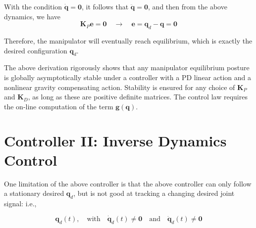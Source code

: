 \documentclass[10pt]{article}
\begin{document}
With the condition  $\dot{\boldsymbol{q}}=\mathbf{0}$, it follows that   $\ddot{\boldsymbol{q}} =\mathbf{0}$, and then from the above dynamics, we have
$$
\boldsymbol{K}_{P} {\boldsymbol{e}}=\mathbf{0} \quad\rightarrow\quad {\boldsymbol{e}}=\boldsymbol{q}_{d}-\boldsymbol{q} = \mathbf{0}
$$

Therefore, the manipulator will eventually reach equilibrium, which is exactly the desired configuration  $\boldsymbol{q}_{d}$.


The above derivation rigorously shows that any manipulator equilibrium posture is globally asymptotically stable under a controller with a PD linear action and a nonlinear gravity compensating action. Stability is ensured for any choice of $\boldsymbol{K}_{P}$ and $\boldsymbol{K}_{D}$, as long as these are positive definite matrices. 
The control law requires the on-line computation of the term $\boldsymbol{g}(\boldsymbol{q})$. 



\section{Controller II: Inverse Dynamics Control}
One limitation of the above controller is that the above controller can only follow a stationary desired $\boldsymbol{q}_d$, but is not good at tracking a changing desired joint signal: i.e., 

\begin{equation}
\label{equ.joint_signal}
\boldsymbol{q}_d(t),\quad\text{with} \quad \boldsymbol{\dot{q}}_d(t)\neq\boldsymbol{0} \quad \text{and} \quad \boldsymbol{\ddot{q}}_d(t)\neq\boldsymbol{0} 
\end{equation}
\end{document}

